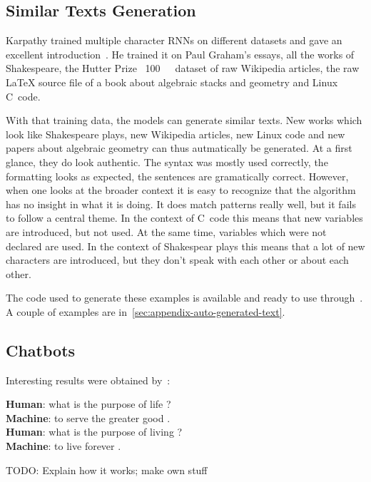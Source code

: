 \subsection{Similar Texts Generation}
Karpathy trained multiple character \glspl{RNN} on different datasets and gave
an excellent introduction~\cite{Karpathy2015}. He trained it on Paul Graham's
essays, all the works of Shakespeare, the Hutter Prize~\cite{hutterPrize}
\SI{100}{\mega\byte}~dataset of raw Wikipedia articles, the raw \LaTeX{} source
file of a book about algebraic stacks and geometry and Linux C~code.

With that training data, the models can generate similar texts. New works which
look like Shakespeare plays, new Wikipedia articles, new Linux code and new
papers about algebraic geometry can thus autmatically be generated. At a first
glance, they do look authentic. The syntax was mostly used correctly, the
formatting looks as expected, the sentences are gramatically correct. However,
when one looks at the broader context it is easy to recognize that the
algorithm has no insight in what it is doing. It does match patterns really
well, but it fails to follow a central theme. In the context of C~code this
means that new variables are introduced, but not used. At the same time,
variables which were not declared are used. In the context of Shakespear plays
this means that a lot of new characters are introduced, but they don't speak
with each other or about each other.

The code used to generate these examples is available and ready to use
through~\cite{charRNNgithub}. A couple of examples are
in~\cref{sec:appendix-auto-generated-text}.


\subsection{Chatbots}%
\label{subsec:chatbots}%

Interesting results were obtained by~\cite{vinyals2015neural}:
\begin{displayquote}
\textbf{Human}: what is the purpose of life ?\\
\textbf{Machine}: to serve the greater good .\\
\textbf{Human}: what is the purpose of living ?\\
\textbf{Machine}: to live forever .
\end{displayquote}

TODO: Explain how it works; make own stuff